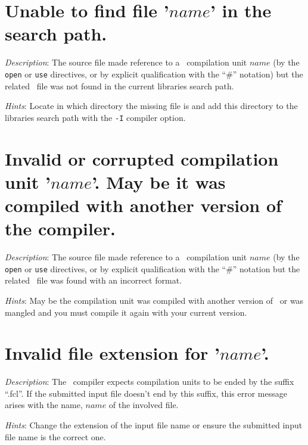 


\section*{Unable to find file '$name$' in the search path.}

{\em Description}: The source file made reference to a \focal\
compilation unit 
$name$ (by the {\tt open} or {\tt use} directives, or by explicit
qualification with the ``\#'' notation) but the related
\focal\ file was not found in the current libraries search
path.

{\em Hints}: Locate in which directory the missing  file is
and add this directory to the libraries search path with the {\tt -I}
compiler option.



\section*{Invalid or corrupted compilation unit '$name$'. May be it
  was compiled with another version of the compiler.}
{\em Description}: The source file made reference to a \focal\
compilation unit
$name$ (by the {\tt open} or {\tt use} directives, or by explicit
qualification with the ``\#'' notation but the related
\focal\  file was found with an incorrect format.

{\em Hints}: May be the compilation unit was compiled with another
version of \focal\ or was mangled and you must compile it again with
your current version.



\section*{Invalid file extension for '$name$'.}
{\em Description}: The \focal\ compiler expects compilation units to be
ended by the suffix ``.fcl''. If the submitted input file doesn't end
by this suffix, this error message arises with the name, $name$ of the
involved file.

{\em Hints}: Change the extension of the input file name or ensure the
submitted input file name is the correct one.



